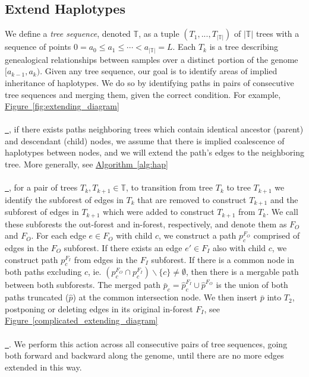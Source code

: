 \documentclass[10pt,twoside,lineno]{gsajnl}
\newcommand{\T}{\mathbb{T}}
\newcommand{\algorithmref}[2][]{%
	\hyperref[{#2}]{%
		Algorithm~\ref*{#2}%
		\ifx\\#1\\%
		\else
		\,#1%
		\fi
	}%
}
\newcommand*{\figref}[2][]{%
	\hyperref[{#2}]{%
		Figure~\ref*{#2}%
		\ifx\\#1\\%
		\else
		\,#1%
		\fi
	}%
}
\begin{document}
\subsection{Extend Haplotypes}

    We define a \textit{tree sequence}, denoted $\T$, 
    as a tuple $\left(T_1,...,T_{|\T|}\right)$ of $|\T|$ trees with a sequence of points
	$0 = a_0 \leq a_1 \leq \cdots < a_{|\T|} = L$.
     Each $T_k$ is a tree describing genealogical relationships between samples
     over a distinct portion of the genome $[a_{k-1}, a_k)$.
    Given any tree sequence, our goal is to
    identify areas of implied inheritance of haplotypes.
    We do so by identifying paths in pairs of consecutive tree sequences
    and merging them, given the correct condition.
    For example, \figref{fig:extending_diagram}, if there exists paths neighboring trees which contain 
    identical ancestor (parent) and descendant (child) nodes, 
    we assume that there is implied coalescence of haplotypes between nodes, 
    and we will extend the path's edges to the neighboring tree.
     More generally, see \algorithmref{alg:hap}, for a pair of trees $T_k, T_{k+1}\in\mathbb{T}$,
     to transition from tree $T_k$ to tree $T_{k+1}$ we identify the 
     subforest of edges in $T_k$ that are removed to construct $T_{k+1}$
     and the subforest of edges in $T_{k+1}$ which were added to construct 
     $T_{k+1}$ from $T_k$. We call these subforests the out-forest and in-forest, respectively,
     and denote them as $F_O$ and $F_O$.
     For each edge $e \in F_O$ with child $c$,
     we construct a path $p_c^{F_O}$ comprised of edges in the $F_O$ subforest.
     If there exists an edge $e'\in F_I$ also with child $c$,
     we construct path $p_c^{F_I}$ from edges in the $F_I$ subforest.
     If there is a common node in both paths excluding $c$, ie. $(p_c^{F_O}\cap p_c^{F_I})\backslash \{c\}\neq\emptyset$, then there is a mergable path between both subforests. The merged path $\bar{p}_c = \hat{p}_c^{F_I} \cup \hat{p}^{F_O}$ is the union of both paths truncated ($\hat{p}$) at the common intersection node. We then insert $\bar{p}$ into $T_2$, postponing or deleting edges in its original in-forest $F_I$, see \figref{complicated_extending_diagram}. We perform this action across all consecutive pairs of tree sequences, going both forward and backward along the genome, until there are no more edges extended in this way.
\end{document}
